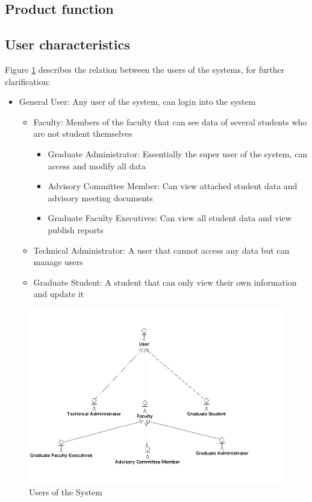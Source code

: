 \documentclass[11pt,a4paper]{report}
\begin{document}
\subsection{Product function}
\subsection{User characteristics}
Figure \ref{fig:users} describes the relation between the users of the systems, for further clarification:
\begin{itemize}
\item General User: Any user of the system, can login into the system 
\begin{itemize}
\item Faculty: Members of the faculty that can see data of several students who are not student themselves
\begin{itemize}
\item Graduate Administrator: Essentially the super user of the system, can access and modify all data 
\item Advisory Committee Member: Can view attached student data and advisory meeting documents
\item Graduate Faculty Executives: Can view all student data and view publish reports 	
\end{itemize}
\item Technical Administrator: A user that cannot access any data but can manage users 
\item Graduate Student: A student that can only view their own information and update it
\end{itemize}
\end{itemize}

\begin{figure}[htp]
\centering
\includegraphics[scale=0.40]{diagrams/use_cases/UserHeirachy_uc.png}
\caption{Users of the System}
\label{fig:users}
\end{figure}
\end{document}
